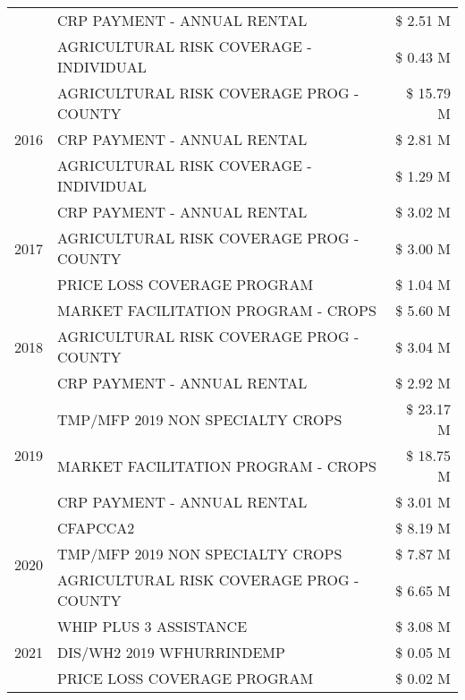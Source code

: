 \begin{tabular}{llr}
 & CRP PAYMENT - ANNUAL RENTAL & \$ 2.51 M \\
 & AGRICULTURAL RISK COVERAGE - INDIVIDUAL & \$ 0.43 M \\
\cline{1-3}
\multirow[t]{3}{*}{2016} & AGRICULTURAL RISK COVERAGE PROG - COUNTY & \$ 15.79 M \\
 & CRP PAYMENT - ANNUAL RENTAL & \$ 2.81 M \\
 & AGRICULTURAL RISK COVERAGE - INDIVIDUAL & \$ 1.29 M \\
\cline{1-3}
\multirow[t]{3}{*}{2017} & CRP PAYMENT - ANNUAL RENTAL & \$ 3.02 M \\
 & AGRICULTURAL RISK COVERAGE PROG - COUNTY & \$ 3.00 M \\
 & PRICE LOSS COVERAGE PROGRAM & \$ 1.04 M \\
\cline{1-3}
\multirow[t]{3}{*}{2018} & MARKET FACILITATION PROGRAM - CROPS & \$ 5.60 M \\
 & AGRICULTURAL RISK COVERAGE PROG - COUNTY & \$ 3.04 M \\
 & CRP PAYMENT - ANNUAL RENTAL & \$ 2.92 M \\
\cline{1-3}
\multirow[t]{3}{*}{2019} & TMP/MFP 2019 NON SPECIALTY CROPS & \$ 23.17 M \\
 & MARKET FACILITATION PROGRAM - CROPS & \$ 18.75 M \\
 & CRP PAYMENT - ANNUAL RENTAL & \$ 3.01 M \\
\cline{1-3}
\multirow[t]{3}{*}{2020} & CFAPCCA2 & \$ 8.19 M \\
 & TMP/MFP 2019 NON SPECIALTY CROPS & \$ 7.87 M \\
 & AGRICULTURAL RISK COVERAGE PROG - COUNTY & \$ 6.65 M \\
\cline{1-3}
\multirow[t]{3}{*}{2021} & WHIP PLUS 3 ASSISTANCE & \$ 3.08 M \\
 & DIS/WH2 2019 WFHURRINDEMP & \$ 0.05 M \\
 & PRICE LOSS COVERAGE PROGRAM & \$ 0.02 M \\
\cline{1-3}
\bottomrule
\end{tabular}
